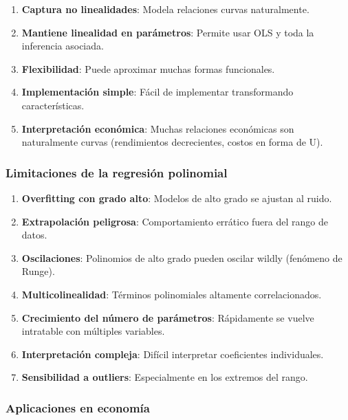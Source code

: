 \documentclass[
  doc,
  floatsintext,
  longtable,
  a4paper,
  nolmodern,
  notxfonts,
  notimes,
  12pt,
  colorlinks=true,linkcolor=blue,citecolor=blue,urlcolor=blue]{apa7}
\begin{document}
\begin{enumerate}
\def\labelenumi{\arabic{enumi}.}
\item
  \textbf{Captura no linealidades}: Modela relaciones curvas
  naturalmente.
\item
  \textbf{Mantiene linealidad en parámetros}: Permite usar OLS y toda la
  inferencia asociada.
\item
  \textbf{Flexibilidad}: Puede aproximar muchas formas funcionales.
\item
  \textbf{Implementación simple}: Fácil de implementar transformando
  características.
\item
  \textbf{Interpretación económica}: Muchas relaciones económicas son
  naturalmente curvas (rendimientos decrecientes, costos en forma de U).
\end{enumerate}

\subsubsection{Limitaciones de la regresión
polinomial}\label{limitaciones-de-la-regresiuxf3n-polinomial}

\begin{enumerate}
\def\labelenumi{\arabic{enumi}.}
\item
  \textbf{Overfitting con grado alto}: Modelos de alto grado se ajustan
  al ruido.
\item
  \textbf{Extrapolación peligrosa}: Comportamiento errático fuera del
  rango de datos.
\item
  \textbf{Oscilaciones}: Polinomios de alto grado pueden oscilar wildly
  (fenómeno de Runge).
\item
  \textbf{Multicolinealidad}: Términos polinomiales altamente
  correlacionados.
\item
  \textbf{Crecimiento del número de parámetros}: Rápidamente se vuelve
  intratable con múltiples variables.
\item
  \textbf{Interpretación compleja}: Difícil interpretar coeficientes
  individuales.
\item
  \textbf{Sensibilidad a outliers}: Especialmente en los extremos del
  rango.
\end{enumerate}

\subsubsection{Aplicaciones en
economía}\label{aplicaciones-en-economuxeda-4}
\end{document}
